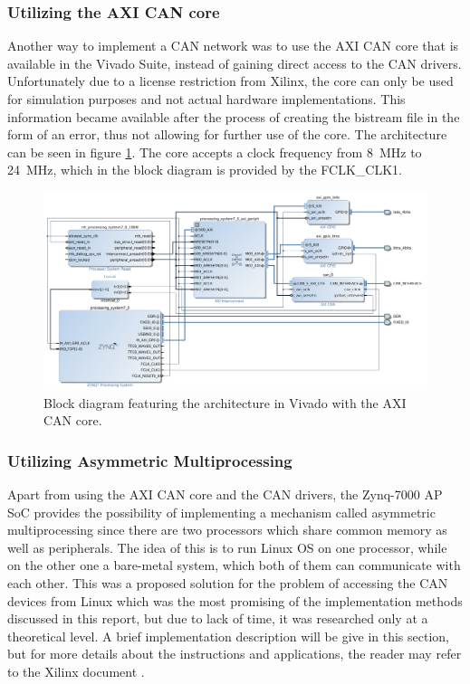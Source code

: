 \subsubsection{Utilizing the AXI CAN core}

Another way to implement a CAN network was to use the AXI CAN core that is available in the Vivado Suite, instead of gaining direct access to the CAN drivers.
Unfortunately due to a license restriction from Xilinx, the core can only be used for simulation purposes and not actual hardware implementations.
This information became available after the process of creating the bistream file in the form of an error, thus not allowing for further use of the core.
The architecture can be seen in figure \ref{fig:CAN_Arch_with_AXI_CAN}.
The core accepts a clock frequency from \SI{8}{\mega\hertz} to \SI{24}{\mega\hertz}, which in the block diagram is provided by the FCLK\_CLK1.

\begin{figure}[h!]
	\centering
	\includegraphics[width = 1.2\linewidth]{graphics/Zybo_Arch_with_AXI_CAN.png}
	\caption{Block diagram featuring the architecture in Vivado with the AXI CAN core.}
	\label{fig:CAN_Arch_with_AXI_CAN}
\end{figure}

\subsubsection{Utilizing Asymmetric Multiprocessing}

Apart from using the AXI CAN core and the CAN drivers, the Zynq-7000 AP SoC provides the possibility of implementing a mechanism called asymmetric multiprocessing since there are two processors which share common memory as well as peripherals.
The idea of this is to run Linux OS on one processor, while on the other one a bare-metal system, which both of them can communicate with each other.
This was a proposed solution for the problem of accessing the CAN devices from Linux which was the most promising of the implementation methods discussed in this report, but due to lack of time, it was researched only at a theoretical level.
A brief implementation description will be give in this section, but for more details about the instructions and applications, the reader may refer to the Xilinx document \cite{Xilinx_AMP}.


